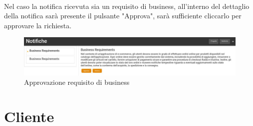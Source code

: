 \documentclass{article}
\begin{document}
\\
Nel caso la notifica ricevuta sia un requisito di business, all'interno del dettaglio della notifica sarà presente il pulsante "Approva", sarà sufficiente cliccarlo per approvare la richiesta.
\begin{figure}[H]
      \centering
      \includegraphics[width=\textwidth]{documenti/Screenshot manuale utente/notifica requisiti business.jpeg}
      \caption{Approvazione requisito di business}
      \label{notreqbusiness}
    \end{figure} 

\section{Cliente}
\end{document}
